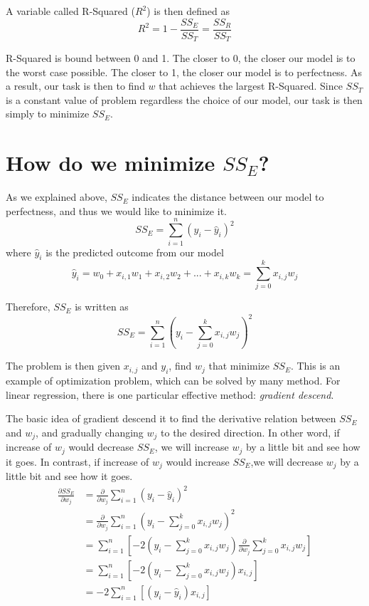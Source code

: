 \documentclass[
	letterpaper
]{article}
\begin{document}
A variable called R-Squared ($R^2$) is then defined as 
\begin{equation}
R^2 = 1 - \frac{SS_E}{SS_T} = \frac{SS_R}{SS_T}
\end{equation}

R-Squared is bound between 0 and 1. The closer to 0, the closer our model is to the worst case possible. The closer to 1, the closer our model is to perfectness.
As a result, our task is then to find $w$ that achieves the largest R-Squared.
Since $SS_T$ is a constant value of problem regardless the choice of our model, our task is then simply to minimize $SS_E$.

\section{How do we minimize $SS_E$?}
As we explained above, $SS_E$ indicates the distance between our model to perfectness, and thus we would like to minimize it.
\begin{equation}
SS_E = \sum_{i = 1}^n (y_i - \hat y_i) ^2
\end{equation}
where $\hat y_i$ is the predicted outcome from our model
\begin{equation}
\hat y_i = w_0 + x_{i, 1}w_1 + x_{i, 2}w_2 + ... + x_{i, k}w_k = \sum_{j=0} ^k x_{i, j}w_j
\end{equation}

Therefore, $SS_E$ is written as
\begin{equation}
SS_E = \sum_{i = 1}^n (y_i - \sum_{j=0} ^k x_{i, j}w_j) ^2
\end{equation}

The problem is then given $x_{i, j}$ and $y_i$, find $w_j$ that minimize $SS_E$.
This is an example of optimization problem, which can be solved by many method.
For linear regression, there is one particular effective method: \textit{gradient descend}.

The basic idea of gradient descend it to find the derivative relation between $SS_E$ and $w_j$, and gradually changing $w_j$ to the desired direction.
In other word, if increase of $w_j$ would decrease $SS_E$, we will increase $w_j$ by a little bit and see how it goes. 
In contrast, if increase of $w_j$ would increase $SS_E$,we will decrease $w_j$ by a little bit and see how it goes. 
\begin{equation}
\begin{split}
\frac{\partial SS_E}{\partial w_j} & = \frac{\partial}{\partial w_j} \sum_{i = 1}^n (y_i - \hat y_i) ^2 \\
&= \frac{\partial}{\partial w_j}\sum_{i = 1}^n (y_i - \sum_{j=0} ^k x_{i, j}w_j) ^2\\
& = \sum_{i = 1}^n \left[-2(y_i - \sum_{j=0} ^k x_{i, j}w_j)  \frac{\partial}{\partial w_j}\sum_{j=0} ^k x_{i, j}w_j \right]\\
& = \sum_{i = 1}^n \left[ -2(y_i - \sum_{j=0} ^k x_{i, j}w_j)  x_{i, j}\right] \\
& = -2\sum_{i = 1}^n\left[(y_i - \hat y_i)  x_{i, j}\right]\\
\end{split}
\end{equation}
\end{document}
